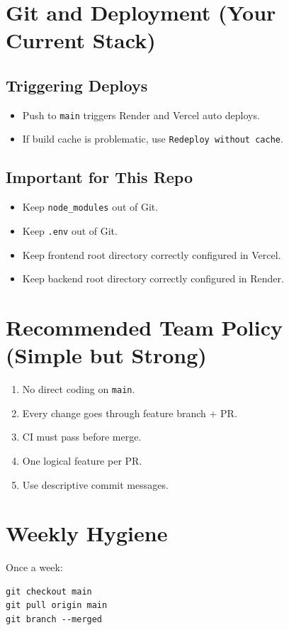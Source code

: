 \documentclass[11pt,a4paper]{article}
\begin{document}
\section{Git and Deployment (Your Current Stack)}
\subsection{Triggering Deploys}
\begin{itemize}[leftmargin=1.5em]
  \item Push to \texttt{main} triggers Render and Vercel auto deploys.
  \item If build cache is problematic, use \texttt{Redeploy without cache}.
\end{itemize}

\subsection{Important for This Repo}
\begin{itemize}[leftmargin=1.5em]
  \item Keep \texttt{node\_modules} out of Git.
  \item Keep \texttt{.env} out of Git.
  \item Keep frontend root directory correctly configured in Vercel.
  \item Keep backend root directory correctly configured in Render.
\end{itemize}

\section{Recommended Team Policy (Simple but Strong)}
\begin{enumerate}[leftmargin=1.5em]
  \item No direct coding on \texttt{main}.
  \item Every change goes through feature branch + PR.
  \item CI must pass before merge.
  \item One logical feature per PR.
  \item Use descriptive commit messages.
\end{enumerate}

\section{Weekly Hygiene}
Once a week:
\begin{Verbatim}[fontsize=\small]
git checkout main
git pull origin main
git branch --merged
\end{Verbatim}
\end{document}
